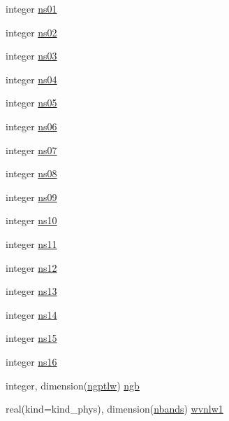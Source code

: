 \begin{DoxyCompactItemize}
\item 
integer \hyperlink{namespacemodule__radlw__parameters_a0f82508bbb4039ebbc3fcb68e8e4e699}{ns01}
\item 
integer \hyperlink{namespacemodule__radlw__parameters_a8b13d877f08e7c26333285fd1db19d4e}{ns02}
\item 
integer \hyperlink{namespacemodule__radlw__parameters_a987d257f8e2f0743e92055be94424401}{ns03}
\item 
integer \hyperlink{namespacemodule__radlw__parameters_a57f85389c924ba16fad61578170eadcc}{ns04}
\item 
integer \hyperlink{namespacemodule__radlw__parameters_a6bb5413129239f08596d4e7233c666a5}{ns05}
\item 
integer \hyperlink{namespacemodule__radlw__parameters_ab936172cdf831f0b956c1475f175eca2}{ns06}
\item 
integer \hyperlink{namespacemodule__radlw__parameters_ac60030c5a4655c6cee7be71dd527ffdc}{ns07}
\item 
integer \hyperlink{namespacemodule__radlw__parameters_a0a9944341bfe4507370bb6b617ac0476}{ns08}
\item 
integer \hyperlink{namespacemodule__radlw__parameters_a8948c9fe0a0f209c62e17e7c526940b8}{ns09}
\item 
integer \hyperlink{namespacemodule__radlw__parameters_a66d1bbe720448a035ccf689d77418cd5}{ns10}
\item 
integer \hyperlink{namespacemodule__radlw__parameters_ace01958b71c7f6923fd9b3ba39b3b668}{ns11}
\item 
integer \hyperlink{namespacemodule__radlw__parameters_aabdc77471aadc2932eb213f3b7ecb66c}{ns12}
\item 
integer \hyperlink{namespacemodule__radlw__parameters_a239c74495526cdf72b28e1f5c1d0318e}{ns13}
\item 
integer \hyperlink{namespacemodule__radlw__parameters_a1d49c23da2ed69069a97f861a28a531e}{ns14}
\item 
integer \hyperlink{namespacemodule__radlw__parameters_a9662e6bd344b1dbbfa7cc4429753bb10}{ns15}
\item 
integer \hyperlink{namespacemodule__radlw__parameters_a3a7ba0b8f35271e7979deea86f834479}{ns16}
\item 
integer, dimension(\hyperlink{namespacemodule__radlw__parameters_a05fe17fe932ce62a3ae2c6c564584321}{ngptlw}) \hyperlink{namespacemodule__radlw__parameters_a2c571bd14c9b7982a7968976858c7547}{ngb}
\item 
real(kind=kind\+\_\+phys), dimension(\hyperlink{namespacemodule__radlw__parameters_a48e11b992a80595d71c92f7c9bfbe19c}{nbands}) \hyperlink{namespacemodule__radlw__parameters_a3a7370a94889d0cbaf6057404830d978}{wvnlw1}

\end{DoxyCompactItemize}
